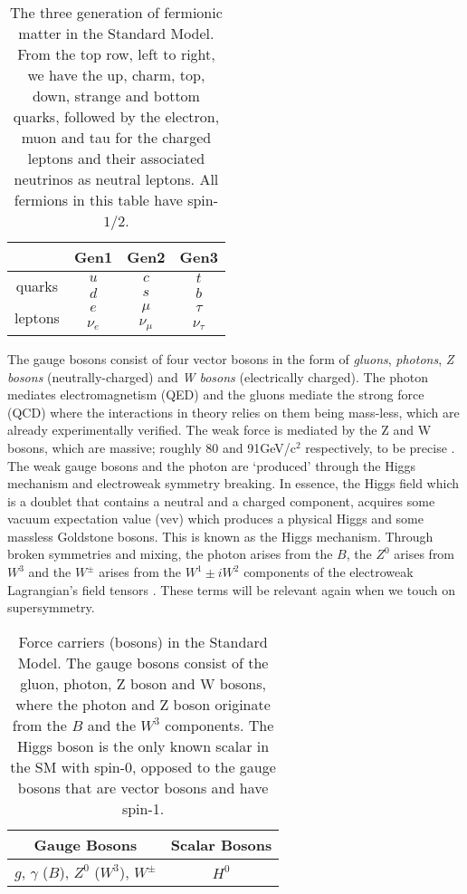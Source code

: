 \begin{table}[htbp]
    \centering
    \begin{tabular}{||c|c|c|c||}
    \hline
    & Gen1 & Gen2 & Gen3 \\
    \hline
    \multirow{2}{1.2cm}{quarks} & $u$ & $c$ & $t$ \\
     & $d$ & $s$ & $b$ \\
    \hline
    \multirow{2}{1.2cm}{leptons} & $e$ & $\mu$ & $\tau$ \\
     & $\nu_e$ & $\nu_\mu$ & $\nu_\tau$ \\
    \hline
    \end{tabular}
    \caption{The three generation of fermionic matter in the Standard Model. From the top row, left to right, we have the up, charm, top, down, strange and bottom quarks, followed by the electron, muon and tau for the charged leptons and their associated neutrinos as neutral leptons. All fermions in this table have spin-$1/2$.}
    \label{tab:SMFerm}
\end{table}


The gauge bosons consist of four vector bosons in the form of \textit{gluons}, \textit{photons}, \textit{Z bosons} (neutrally-charged) and \textit{W bosons} (electrically charged). The photon mediates electromagnetism (QED) and the gluons mediate the strong force (QCD) where the interactions in theory relies on them being mass-less, which are already experimentally verified. The weak force is mediated by the Z and W bosons, which are massive; roughly 80 and 91GeV/c$^2$ respectively, to be precise \cite{tanabashi2018review}. The weak gauge bosons and the photon are `produced' through the Higgs mechanism and electroweak symmetry breaking. In essence, the Higgs field which is a doublet that contains a neutral and a charged component, acquires some vacuum expectation value (vev) which produces a physical Higgs and some massless Goldstone bosons. This is known as the Higgs mechanism. Through broken symmetries and mixing, the photon arises from the $B$, the $Z^0$ arises from $W^3$ and the $W^\pm$ arises from the $W^1 \pm iW^2$ components of the electroweak Lagrangian's field tensors \cite{thomson2013modern}. These terms will be relevant again when we touch on supersymmetry. \\

\begin{table}[htbp]
    \centering
    \begin{tabular}{||c|c||}
    \hline
       Gauge Bosons  & Scalar Bosons \\
     \hline
       $g$, $\gamma$ ($B$), $Z^0$ ($W^3$), $W^\pm$ & $H^0$ \\
     \hline
    \end{tabular}
    \caption{Force carriers (bosons) in the Standard Model. The gauge bosons consist of the gluon, photon, Z boson and W bosons, where the photon and Z boson originate from the $B$ and the $W^3$ components. The Higgs boson is the only known scalar in the SM with spin-0, opposed to the gauge bosons that are vector bosons and have spin-1.}
    \label{tab:SMBos}
\end{table}


